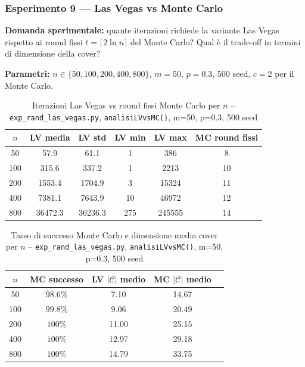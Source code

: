 \documentclass[12pt, a4paper]{article}
\begin{document}
\subsubsection{Esperimento 9 — Las Vegas vs Monte Carlo}

\textbf{Domanda sperimentale:} quante iterazioni richiede la variante 
Las Vegas rispetto ai round fissi $t = \lceil 2 \ln n \rceil$ 
del Monte Carlo? Qual \`e il trade-off in termini di dimensione della cover?

\textbf{Parametri:} $n \in \{50, 100, 200, 400, 800\}$, $m=50$, 
$p=0.3$, 500 seed, $c=2$ per il Monte Carlo.

\begin{table}[H]
\centering
\caption{Iterazioni Las Vegas vs round fissi Monte Carlo per $n$ -- 
\texttt{exp\_rand\_las\_vegas.py}, \texttt{analisiLVvsMC()}, m=50, p=0.3, 500 seed}
\label{tab:exp9_iter}
\begin{tabular}{cccccc}
\toprule
$n$ & LV media & LV std & LV min & LV max & MC round fissi \\
\midrule
50  & 57.9    & 61.1    & 1   & 386    & 8  \\
100 & 315.6   & 337.2   & 1   & 2213   & 10 \\
200 & 1553.4  & 1704.9  & 3   & 15324  & 11 \\
400 & 7381.1  & 7643.9  & 10  & 46972  & 12 \\
800 & 36472.3 & 36236.3 & 275 & 245555 & 14 \\
\bottomrule
\end{tabular}
\end{table}

\begin{table}[H]
\centering
\caption{Tasso di successo Monte Carlo e dimensione media cover per $n$ -- 
\texttt{exp\_rand\_las\_vegas.py}, \texttt{analisiLVvsMC()}, m=50, p=0.3, 500 seed}
\label{tab:exp9_qual}
\begin{tabular}{ccccc}
\toprule
$n$ & MC successo & LV $|\mathcal{C}|$ medio & MC $|\mathcal{C}|$ medio \\
\midrule
50  & $98.6\%$ & 7.10  & 14.67 \\
100 & $99.8\%$ & 9.06  & 20.49 \\
200 & $100\%$  & 11.00 & 25.15 \\
400 & $100\%$  & 12.97 & 29.18 \\
800 & $100\%$  & 14.79 & 33.75 \\
\bottomrule
\end{tabular}
\end{table}
\end{document}
